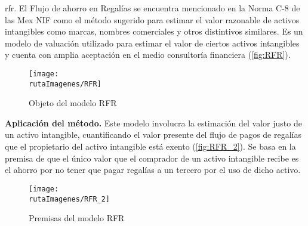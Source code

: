 \textcolor{secundario}{\gls{rfr}.} El  Flujo de ahorro en Regal\'ias se encuentra mencionado en la Norma C-8 de las Mex NIF como el m\'etodo sugerido para estimar el valor razonable de activos intangibles como marcas, nombres comerciales y otros distintivos similares. Es un modelo de valuaci\'on utilizado para estimar el valor de ciertos activos intangibles  y cuenta con amplia aceptaci\'on en el medio consultor\'ia financiera (\autoref{fig:RFR}).

\begin{figure}[H]
\centering
\caption{Objeto del modelo RFR\label{fig:RFR}}
\texttt{[image: \\rutaImagenes/RFR]}\\
\end{figure}

\textbf{\textcolor{principal}{Aplicaci\'on del m\'etodo.}} Este modelo involucra la estimaci\'on del valor justo de un activo intangible, cuantificando el valor presente del flujo de pagos de regal\'ias que el propietario del activo intangible est\'a exento (\autoref{fig:RFR_2}). Se basa en la premisa de que el \'unico valor que el comprador de un activo intangible recibe es el ahorro por no tener que pagar regal\'ias a un tercero por el uso de dicho activo.

\begin{figure}[H]
\centering
\caption{Premisas del modelo RFR\label{fig:RFR_2}}
\texttt{[image: \\rutaImagenes/RFR\_2]}\\
\end{figure}